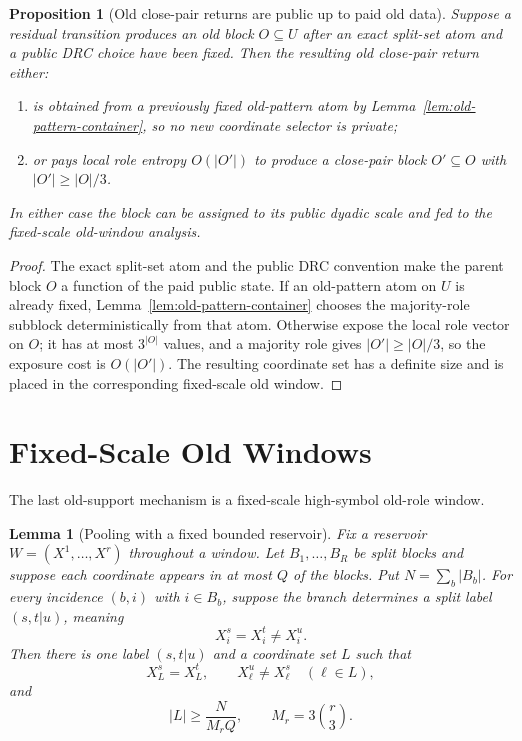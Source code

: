 \documentclass[11pt]{article}
\newtheorem{lemma}[theorem]{Lemma}
\newtheorem{proposition}[theorem]{Proposition}
\begin{document}
\begin{proposition}[Old close-pair returns are public up to paid old data]
\label{prop:old-return-public}
Suppose a residual transition produces an old block $O\subseteq U$ after an
exact split-set atom and a public DRC choice have been fixed.  Then the
resulting old close-pair return either:
\begin{enumerate}[label=\textup{(\roman*)}]
\item is obtained from a previously fixed old-pattern atom by
Lemma~\ref{lem:old-pattern-container}, so no new coordinate selector is
private;
\item or pays local role entropy $O(|O'|)$ to produce a close-pair block
$O'\subseteq O$ with $|O'|\ge |O|/3$.
\end{enumerate}
In either case the block can be assigned to its public dyadic scale and fed
to the fixed-scale old-window analysis.
\end{proposition}

\begin{proof}
The exact split-set atom and the public DRC convention make the parent block
$O$ a function of the paid public state.  If an old-pattern atom on $U$ is
already fixed, Lemma~\ref{lem:old-pattern-container} chooses the majority-role
subblock deterministically from that atom.  Otherwise expose the local role
vector on $O$; it has at most $3^{|O|}$ values, and a majority role gives
$|O'|\ge |O|/3$, so the exposure cost is $O(|O'|)$.  The resulting coordinate
set has a definite size and is placed in the corresponding fixed-scale old
window.
\end{proof}

\section{Fixed-Scale Old Windows}

The last old-support mechanism is a fixed-scale high-symbol old-role window.

\begin{lemma}[Pooling with a fixed bounded reservoir]
\label{lem:reservoir-pooling}
Fix a reservoir $W=(X^1,\ldots,X^r)$ throughout a window.  Let
$B_1,\ldots,B_R$ be split blocks and suppose each coordinate appears in at
most $Q$ of the blocks.  Put $N=\sum_b |B_b|$.  For every incidence
$(b,i)$ with $i\in B_b$, suppose the branch determines a split label
$(s,t|u)$, meaning
\[
  X^s_i=X^t_i\ne X^u_i.
\]
Then there is one label $(s,t|u)$ and a coordinate set $L$ such that
\[
  X^s_L=X^t_L,\qquad X^u_\ell\ne X^s_\ell\quad(\ell\in L),
\]
and
\[
  |L|\ge \frac{N}{M_r Q},
  \qquad
  M_r=3\binom r3.
\]
\end{lemma}
\end{document}
